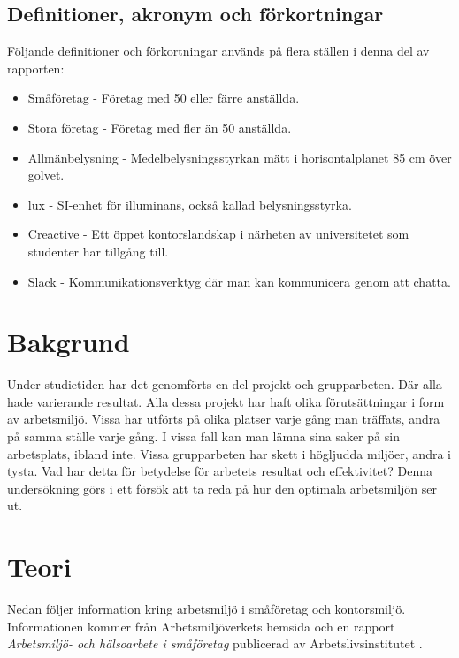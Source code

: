 \subsection{Definitioner, akronym och förkortningar}
Följande definitioner och förkortningar används på flera ställen i denna del av rapporten:

\begin{itemize}
\item Småföretag - Företag med 50 eller färre anställda.
\item Stora företag - Företag med fler än 50 anställda.
\item Allmänbelysning - Medelbelysningsstyrkan mätt i horisontalplanet 85 cm över golvet.
\item lux - SI-enhet för illuminans, också kallad belysningsstyrka.
\item Creactive - Ett öppet kontorslandskap i närheten av universitetet som studenter har tillgång till.
\item Slack - Kommunikationsverktyg där man kan kommunicera genom att chatta. 
\end{itemize}

\section{Bakgrund}
\label{sec:background-hampus}

Under studietiden har det genomförts en del projekt och grupparbeten. Där alla hade varierande resultat. Alla dessa projekt har haft olika förutsättningar i form av arbetsmiljö. Vissa har utförts på olika platser varje gång man träffats, andra på samma ställe varje gång. I vissa fall kan man lämna sina saker på sin arbetsplats, ibland inte. Vissa grupparbeten har skett i högljudda miljöer, andra i tysta. Vad har detta för betydelse för arbetets resultat och effektivitet? Denna undersökning görs i ett försök att ta reda på hur den optimala arbetsmiljön ser ut. 

\section{Teori}
\label{sec:theory-hampus}
Nedan följer information kring arbetsmiljö i småföretag och kontorsmiljö. Informationen kommer från Arbetsmiljöverkets hemsida och en rapport \textit{Arbetsmiljö- och hälsoarbete i småföretag} publicerad av Arbetslivsinstitutet \cite{AV}\cite{smaforetag}.


